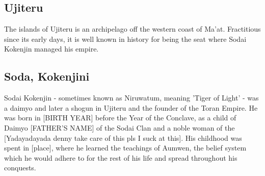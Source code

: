 \begin{multicols}{2}
	\section{Ujiteru}
		The islands of Ujiteru is an archipelago off the western coast of Ma'at. Fractitious since its early days, it is well known in history for being the seat where Sodai Kokenjin managed his empire.
		\subsection{Soda, Kokenjini}
					 
			Sodai Kokenjin - sometimes known as Niruwatum, meaning 'Tiger of Light' - was a daimyo and later a shogun in Ujiteru and the founder of the Toran Empire. He was born in [BIRTH YEAR] before the Year of the Conclave, as a child of Daimyo [FATHER'S NAME] of the Sodai Clan and a noble woman of the [Yadayadayada denny take care of this pls I suck at this]. His childhood was spent in [place], where he learned the teachings of Aumwen, the belief system which he would adhere to for the rest of his life and spread throughout his conquests.\par
			[Accession to the throne]\par
			[Unification of Ujiteru]\par
			[Conquest of the Trinity]\par
			[Conquest of Qian]\par
			[Conquest of Al-Eru]\par
			[Betrayal]\par
\end{multicols}